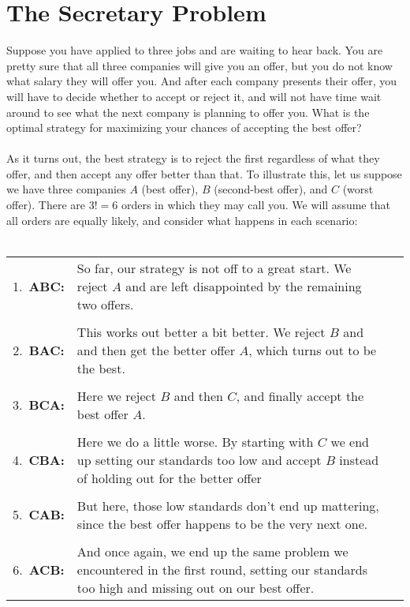 \documentclass{report}
\begin{document}
\section{The Secretary Problem}
Suppose you have applied to three jobs and are waiting to hear back. You are pretty sure that all three companies will give you an offer, but you do not know what salary they will offer you. And after each company presents their offer, you will have to decide whether to accept or reject it, and will not have time wait around to see what the next company is planning to offer you. What is the optimal strategy for maximizing your chances of accepting the best offer?
\\\\ 
As it turns out, the best strategy is to reject the first regardless of what they offer, and then accept any offer better than that. To illustrate this, let us suppose we have three companies $A$ (best offer), $B$ (second-best offer), and $C$ (worst offer). There are $3!=6$ orders in which they may call you. We will assume that all orders are equally likely, and consider what happens in each scenario:
\\\\
\allowdisplaybreaks
\begin{tabularx}{325pt}{cXc}

1.\ \textbf{ABC:} 
&
So far, our strategy is not off to a great start. We reject $A$ and are left disappointed by the remaining two offers. 
&
\raisebox{-0.75\height}{}
\\\\
2.\ \textbf{BAC:} 
&
This works out better a bit better. We reject $B$ and and then get the better offer $A$, which turns out to be the best.
&
\raisebox{-0.75\height}{}
\\\\
3.\ \textbf{BCA:} 
&
Here we reject $B$ and then $C$, and finally accept the best offer $A$.
&
\raisebox{-0.75\height}{}
\\\\
4.\ \textbf{CBA:} 
&
Here we do a little worse. By starting with $C$ we end up setting our standards too low and accept $B$ instead of holding out for the better offer
&
\raisebox{-0.75\height}{}
\\\\

5.\ \textbf{CAB:} 
&
But here, those low standards don't end up mattering, since the best offer happens to be the very next one.
&
\raisebox{-0.75\height}{}
\\\\

6.\ \textbf{ACB:} 
&
And once again, we end up the same problem we encountered in the first round, setting our standards too high and missing out on our best offer.
&
\raisebox{-0.75\height}{}

\end{tabularx}
\end{document}
